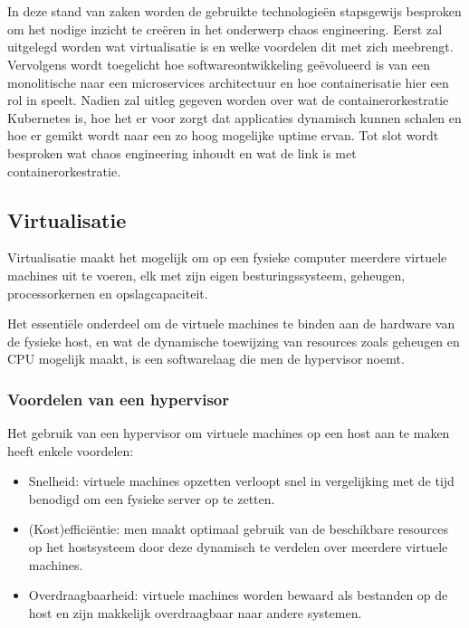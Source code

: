 \chapter{}
\label{ch:stand-van-zaken}


In deze stand van zaken worden de gebruikte technologieën stapsgewijs besproken om het nodige inzicht te creëren in het onderwerp chaos engineering. Eerst zal uitgelegd worden wat virtualisatie is en welke voordelen dit met zich meebrengt.
Vervolgens wordt toegelicht hoe softwareontwikkeling geëvolueerd is van een monolitische naar een microservices architectuur en hoe containerisatie hier een rol in speelt. Nadien zal uitleg gegeven worden over wat de containerorkestratie Kubernetes is, hoe het er voor zorgt dat applicaties dynamisch kunnen schalen en hoe er gemikt wordt naar een zo hoog mogelijke uptime ervan. Tot slot wordt besproken wat chaos engineering inhoudt en wat de link is met containerorkestratie.   

\section{Virtualisatie}

Virtualisatie maakt het mogelijk om op een fysieke computer meerdere virtuele machines uit te voeren, elk met zijn eigen besturingssysteem, geheugen, processorkernen en opslagcapaciteit.

Het essentiële onderdeel om de virtuele machines te binden aan de hardware van de fysieke host, en wat de dynamische toewijzing van resources zoals geheugen en CPU mogelijk maakt, is een softwarelaag die men de hypervisor noemt. 

\subsection{Voordelen van een hypervisor}

Het gebruik van een hypervisor om virtuele machines op een host aan te maken heeft enkele voordelen:
\begin{itemize}
    \item Snelheid: virtuele machines opzetten verloopt snel in vergelijking met de tijd benodigd om een fysieke server op te zetten.
    \item (Kost)efficiëntie: men maakt optimaal gebruik van de beschikbare resources op het hostsysteem door deze dynamisch te verdelen over meerdere virtuele machines.   
    \item Overdraagbaarheid: virtuele machines worden bewaard als bestanden op de host en zijn makkelijk overdraagbaar naar andere systemen.
\end{itemize}

